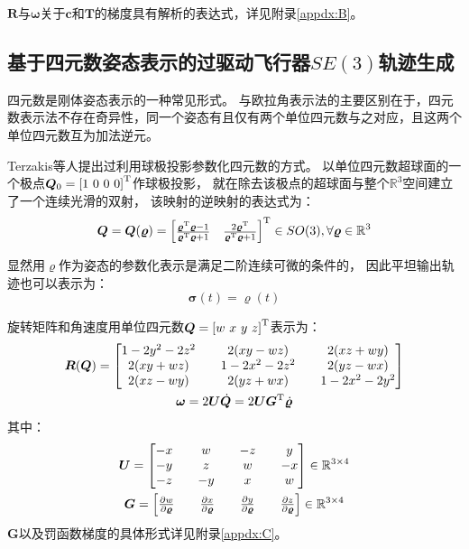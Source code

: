 $\bm{R}$与$\bm{\omega}$关于$\bm{c}$和$\bm{T}$的梯度具有解析的表达式，详见附录\ref{appdx:B}。

\subsection{基于四元数姿态表示的过驱动飞行器$SE(3)$轨迹生成}\label{subsec:planning_based_on_quaternion}
四元数是刚体姿态表示的一种常见形式。
与欧拉角表示法的主要区别在于，四元数表示法不存在奇异性，同一个姿态有且仅有两个单位四元数与之对应，且这两个单位四元数互为加法逆元。

Terzakis等人提出过利用球极投影参数化四元数的方式\cite{terzakis2014quaternion}。
以单位四元数超球面的一个极点$\bm{Q}_0=\trans{[1\  0 \ 0 \ 0]}$作球极投影，
就在除去该极点的超球面与整个$\mathbb{R}^3$空间建立了一个连续光滑的双射，
该映射的逆映射的表达式为： 
\begin{equation}
  \bm{Q} = \bm{Q}(\bm{\varrho}) = {
    \begin{bmatrix}
      \frac{{\bm{\varrho}}^{\text{T}}\bm{\varrho}-1}{{\bm{\varrho}}^{\text{T}}\bm{\varrho}+1} & 
      \frac{2{\bm{\varrho}}^{\text{T}}}{{\bm{\varrho}}^{\text{T}}\bm{\varrho}+1}
    \end{bmatrix}
  }^{\text{T}} \in SO(3), \forall \bm{\varrho} \in \mathbb{R}^3
  \label{equ:R3_to_quaternion}
\end{equation}

显然用$\bm{\varrho}$作为姿态的参数化表示是满足二阶连续可微的条件的，
因此平坦输出轨迹也可以表示为：
\begin{equation}
  \bm{\sigma}(t) = \bm{\varrho}(t)
\end{equation}

旋转矩阵和角速度用单位四元数$\bm{Q} = {[w\  x \ y \ z]}^{\text{T}}$表示为：
\begin{gather}
  \bm{R}(\bm{Q}) = 
  \begin{bmatrix}
    1 - 2y^2 -2z^2 & & 2(xy - wz) & & 2(xz + wy) \\ 
    2(xy + wz) & & 1 - 2x^2 - 2z^2 & & 2(yz - wx) \\ 
    2(xz - wy) & & 2(yz + wx) & & 1 - 2x^2 - 2y^2
  \end{bmatrix} \label{equ:quaternion_to_R} \\ 
  \bm{\omega} = 2\bm{U}\dot{\bm{Q}} = 2\bm{U}{\bm{G}}^{\text{T}}\dot{\bm{\varrho}} \label{equ:dquat_to_omega}
\end{gather}
其中： 
\begin{gather}
  \bm{U} = 
  \begin{bmatrix}
    -x & & w & & -z & & y \\
    -y & & z & & w & & -x \\
    -z & & -y & & x & & w
  \end{bmatrix} \in \mathbb{R}^{3\times 4} \label{equ:matrix_U}\\
  \bm{G} = 
  \begin{bmatrix}
    \frac{\partial{w}}{\partial{\bm{\varrho}}} & & \frac{\partial{x}}{\partial{\bm{\varrho}}} & & \frac{\partial{y}}{\partial{\bm{\varrho}}} & & \frac{\partial{z}}{\partial{\bm{\varrho}}}
  \end{bmatrix} \in \mathbb{R}^{3 \times 4} \label{equ:matrix_G}
\end{gather}
$\bm{G}$以及罚函数梯度的具体形式详见附录\ref{appdx:C}。

